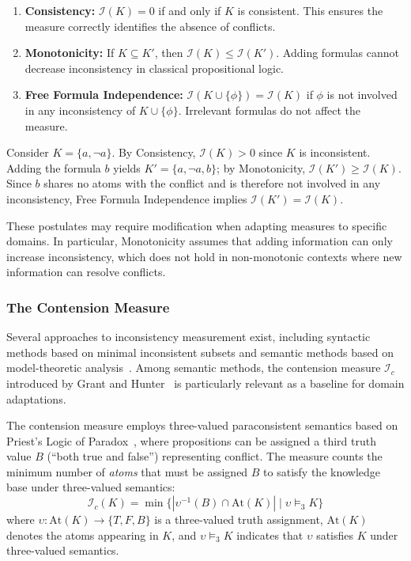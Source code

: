 \begin{enumerate}
    \item \textbf{Consistency:} $\mathcal{I}(K) = 0$ if and only if $K$ is consistent. This ensures the measure correctly identifies the absence of conflicts.
    \item \textbf{Monotonicity:} If $K \subseteq K'$, then $\mathcal{I}(K) \leq \mathcal{I}(K')$. Adding formulas cannot decrease inconsistency in classical propositional logic.
    \item \textbf{Free Formula Independence:} $\mathcal{I}(K \cup \{\phi\}) = \mathcal{I}(K)$ if $\phi$ is not involved in any inconsistency of $K \cup \{\phi\}$. Irrelevant formulas do not affect the measure.
\end{enumerate}

\begin{example}
    Consider $K = \{a, \neg a\}$. By Consistency, $\mathcal{I}(K) > 0$ since $K$ is inconsistent. Adding the formula $b$ yields $K' = \{a, \neg a, b\}$; by Monotonicity, $\mathcal{I}(K') \geq \mathcal{I}(K)$. Since $b$ shares no atoms with the conflict and is therefore not involved in any inconsistency, Free Formula Independence implies $\mathcal{I}(K') = \mathcal{I}(K)$.
\end{example}

These postulates may require modification when adapting measures to specific domains. In particular, Monotonicity assumes that adding information can only increase inconsistency, which does not hold in non-monotonic contexts where new information can resolve conflicts.

\subsubsection{The Contension Measure}

Several approaches to inconsistency measurement exist, including syntactic methods based on minimal inconsistent subsets and semantic methods based on model-theoretic analysis~\cite{Thimm2019}. Among semantic methods, the contension measure $\mathcal{I}_c$ introduced by Grant and Hunter~\cite{Grant2011} is particularly relevant as a baseline for domain adaptations.

The contension measure employs three-valued paraconsistent semantics based on Priest's Logic of Paradox~\cite{Priest1979}, where propositions can be assigned a third truth value $B$ (``both true and false'') representing conflict. The measure counts the minimum number of \emph{atoms} that must be assigned $B$ to satisfy the knowledge base under three-valued semantics:
\begin{equation*}
    \mathcal{I}_c(K) = \min\{|\upsilon^{-1}(B) \cap \text{At}(K)| \mid \upsilon \models_3 K\}
\end{equation*}
where $\upsilon : \text{At}(K) \to \{T, F, B\}$ is a three-valued truth assignment, $\text{At}(K)$ denotes the atoms appearing in $K$, and $\upsilon \models_3 K$ indicates that $\upsilon$ satisfies $K$ under three-valued semantics.

